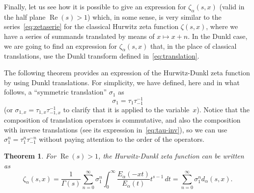 \documentclass[a4paper]{amsart}
\newcommand{\Ea}{E_{\alpha}}
\renewcommand{\Re}{\operatorname{Re}}
\theoremstyle{plain}
\newtheorem{theorem}{Theorem}[section]
\theoremstyle{definition}
\theoremstyle{remark}
\numberwithin{equation}{section}
\begin{document}
Finally, let us see how it is possible to give an expression for $\zeta_{\alpha}(s,x)$ (valid in the half plane $\Re(s)>1$) which, in some sense, is very similar to the series~\eqref{eq:zetaserie} for the classical Hurwitz zeta function $\zeta(s,x)$, where we have a series of summands translated by means of $x \mapsto x+n$. In the Dunkl case, we are going to find an expression for $\zeta_{\alpha}(s,x)$ that, in the place of classical translations, use the Dunkl transform defined in~\eqref{eq:translation}. 

The following theorem provides an expression of the Hurwitz-Dunkl zeta function by using Dunkl translations. For simplicity, we have defined, here and in what follows, a ``symmetric translation'' $\sigma_1$ as 
\[
\sigma_1 = \tau_{1}\tau_{-1}^{-1}
\]
(or $\sigma_{1,x} = \tau_{1,x}\tau_{-1,x}^{-1}$ to clarify that it is applied to the variable~$x$). Notice that the composition of translation operators is commutative, and also the composition with inverse translations (see its expression in~\eqref{eq:tau-inv}), so we can use $\sigma_1^n = \tau_{1}^n\tau_{-1}^{-n}$ without paying attention to the order of the operators.

\begin{theorem}
\label{teo:HD-traslations}
For $\Re(s) > 1$, the Hurwitz-Dunkl zeta function can be written as
\begin{equation}
\label{eq:HD-traslations}
\zeta_{\alpha}(s,x) = \frac{1}{\Gamma(s)} \sum_{n=0}^{\infty}
\sigma_1^n \int_{0}^{\infty} \frac{\Ea(-xt)}{\Ea(t)} t^{s-1} \,dt
= \sum_{n=0}^{\infty} \sigma_1^n  d_{\alpha}(s,x).
\end{equation}
\end{theorem}
\end{document}
